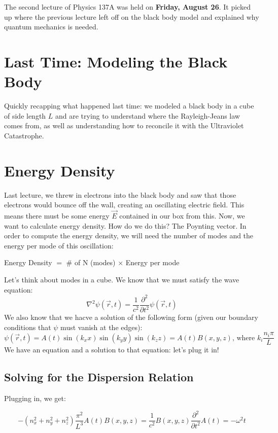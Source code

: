 The second lecture of Physics 137A was held on  \textbf{Friday, August 26}. It picked up where the previous lecture left off on the black body model and explained why quantum mechanics is needed.

      \section{Last Time: Modeling the Black Body}
        Quickly recapping what happened last time: we modeled a black body in a cube of side length $L$ and are trying to understand where the Rayleigh-Jeans law comes from, as well as understanding how to reconcile it with the Ultraviolet Catastrophe.

      \section{Energy Density}
        Last lecture, we threw in electrons into the black body and saw that those electrons would bounce off the wall, creating an oscillating electric field. This means there must be some energy $\vec{E}$ contained in our box from this. Now, we want to calculate energy density. How do we do this? The Poynting vector. In order to compute the energy density, we will need the number of modes and the energy per mode of this oscillation:

        \begin{insight*}{}{}
          Energy Density $=$ \# of N (modes) $\times$ Energy per mode
        \end{insight*}

      Let's think about modes in a cube. We know that we must satisfy the wave equation:
      $$\nabla^2\psi(\vec{r},t) = \frac{1}{c^2}\frac{\partial^2}{\partial t^2}\psi(\vec{r},t)$$
      We also know that we hacve a solution of the following form (given our boundary conditions that $\psi$ must vanish at the edges):
      $$\psi(\vec{r},t) = A(t)\sin(k_xx)\sin(k_yy)\sin(k_zz) = A(t)B(x,y,z)\text{, where } k_i \frac{n_i\pi}{L}$$
      We have an equation and a solution to that equation: let's plug it in!

      \subsection{Solving for the Dispersion Relation}
        Plugging in, we get:

        \[  -(n_x^2 + n_y^2 + n_z^2) \frac{\pi^2}{L^3} A(t) B(x, y, z) = \frac{1}{c^2} B(x,y, z)\frac{\partial^2}{\partial t^2} A(t) = -\omega^2t\]

